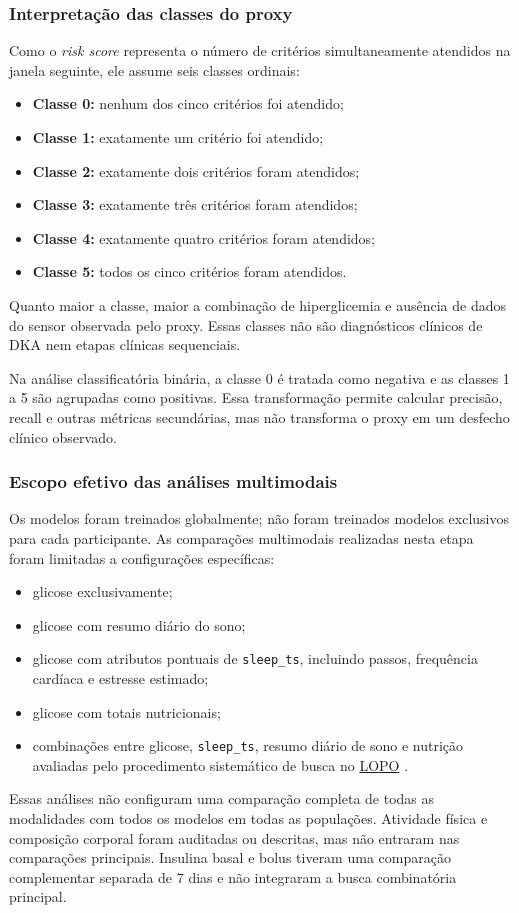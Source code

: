 \documentclass[12pt,a4paper]{article}
\DeclareRobustCommand{\sigla}[1]{%
    \texorpdfstring{\hyperlink{sigla:#1}{#1}}{#1}%
}
\begin{document}
\subsubsection{Interpretação das classes do proxy}
Como o \textit{risk score} representa o número de critérios simultaneamente
atendidos na janela seguinte, ele assume seis classes ordinais:
\begin{itemize}
    \item \textbf{Classe 0:} nenhum dos cinco critérios foi atendido;
    \item \textbf{Classe 1:} exatamente um critério foi atendido;
    \item \textbf{Classe 2:} exatamente dois critérios foram atendidos;
    \item \textbf{Classe 3:} exatamente três critérios foram atendidos;
    \item \textbf{Classe 4:} exatamente quatro critérios foram atendidos;
    \item \textbf{Classe 5:} todos os cinco critérios foram atendidos.
\end{itemize}
Quanto maior a classe, maior a combinação de hiperglicemia e ausência de dados
do sensor observada pelo proxy. Essas classes não são diagnósticos clínicos de
DKA nem etapas clínicas sequenciais.

Na análise classificatória binária, a classe 0 é tratada como negativa e as
classes 1 a 5 são agrupadas como positivas. Essa transformação permite calcular
precisão, recall e outras métricas secundárias, mas não transforma o proxy em
um desfecho clínico observado.

\subsubsection{Escopo efetivo das análises multimodais}
Os modelos foram treinados globalmente; não foram treinados modelos exclusivos
para cada participante. As comparações multimodais realizadas nesta etapa
foram limitadas a configurações específicas:
\begin{itemize}
    \item glicose exclusivamente;
    \item glicose com resumo diário do sono;
    \item glicose com atributos pontuais de \texttt{sleep\_ts}, incluindo passos,
    frequência cardíaca e estresse estimado;
    \item glicose com totais nutricionais;
    \item combinações entre glicose, \texttt{sleep\_ts}, resumo diário de sono
    e nutrição avaliadas pelo procedimento sistemático de busca no \sigla{LOPO}.
\end{itemize}
Essas análises não configuram uma comparação completa de todas as modalidades
com todos os modelos em todas as populações. Atividade física e composição
corporal foram auditadas ou descritas, mas não entraram nas comparações
principais. Insulina basal e bolus tiveram uma comparação complementar
separada de 7 dias e não integraram a busca combinatória principal.
\end{document}
